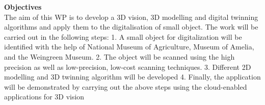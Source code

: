 \textbf{Objectives}\\
The aim of this WP is to develop a 3D vision, 3D modelling and digital twinning algorithms and apply them to the digitalisation of small object. The work will be carried out in the following steps: 1. A small object for digitalization will be identified with the help of National Museum of Agriculture, Museum of Amelia, and the Weingreen Museum. 2. The object will be scanned using the high precision as well as low-precision, low-cost scanning techniques. 3. Different 2D modelling and 3D twinning algorithm will be developed 4. Finally, the application will be demonstrated by carrying out the above steps using the cloud-enabled applications for 3D vision
\par

